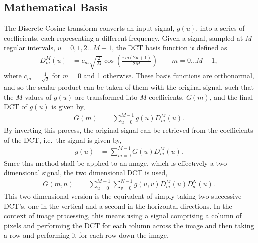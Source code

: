 	\subsection{Mathematical Basis} %
		\label{sub:mathematical_basis}
		The Discrete Cosine transform converts an input signal, $g(u)$, into a series of coefficients, each representing a different frequency. Given a signal, sampled at $M$ regular intervals, $u=0,1,2\ldots M-1$, the DCT basis function is defined as
		\begin{align}
			D_m^M(u) &= c_m \sqrt{\frac{2}{M}}\cos\left(\frac{\pi m(2u+1)}{2M}\right) \qquad m=0\ldots M-1,
		\end{align}
		where $c_m=\frac{1}{\sqrt 2}$ for $m=0$ and 1 otherwise. These basis functions are orthonormal, and so the scalar product can be taken of them with the original signal, such that the $M$ values of $g(u)$ are transformed into $M$ coefficients, $G(m)$, and the final DCT of $g(u)$ is given by,
		\begin{align}
			G(m) &= \sum_{u=0}^{M-1} g(u) D_m^M(u).
		\end{align}
		By inverting this process, the original signal can be retrieved from the coefficients of the DCT, i.e.\ the signal is given by,
		\begin{align}
			g(u) &= \sum_{m=0}^{M-1} G(u) D_m^M(u).
		\end{align}
		Since this method shall be applied to an image, which is effectively a two dimensional signal, the two dimensional DCT is used,
		\begin{align}
			G(m,n) &= \sum_{u=0}^{M-1}\sum_{v=0}^{N-1} g(u,v) D_m^M(u)D_n^N(u).
		\end{align}
		This two dimensional version is the equivalent of simply taking two successive DCT's, one in the vertical and a second in the horizontal directions. In the context of image processing, this means using a signal comprising a column of pixels and performing the DCT for each column across the image and then taking a row and performing it for each row down the image.

